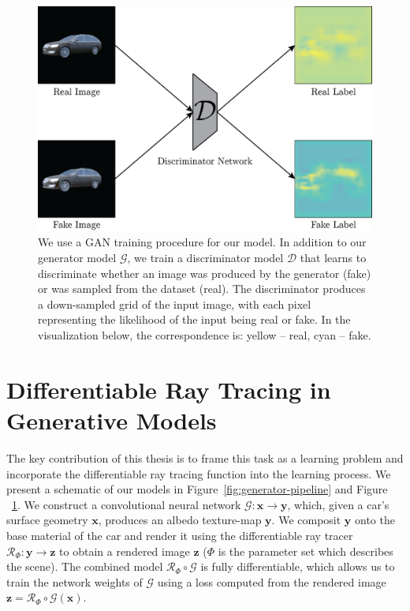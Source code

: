 \begin{figure}[ht]
    \centering
    \caption{We use a GAN training procedure for our model. In addition to our generator model $\mathcal{G}$, we
    train a discriminator model $\mathcal{D}$ that learns to discriminate whether an image was produced by the
    generator (fake) or was sampled from the dataset (real). The discriminator produces a down-sampled grid of
    the input image, with each pixel representing the likelihood of the input being real or fake. In the
    visualization below, the correspondence is: yellow -- real, cyan -- fake.}
    \label{fig:discriminator-pipeline}
    \vspace{0.2in}
    \includegraphics[width=.9\linewidth]{graphics/pipeline-2.png}
\end{figure}

\section{Differentiable Ray Tracing in Generative Models} \label{sec:diffrtgan}

The key contribution of this thesis is to frame this task as a learning problem and
incorporate the differentiable ray tracing function \cite{li2018differentiable} into the
learning process. We present a schematic of our models in Figure~\ref{fig:generator-pipeline}
and Figure ~\ref{fig:discriminator-pipeline}. We construct a convolutional neural network
$\mathcal{G}: \mathbf{x} \rightarrow \mathbf{y}$, which, given a car's surface geometry
$\mathbf{x}$, produces an albedo texture-map $\mathbf{y}$. We composit $\mathbf{y}$ onto the
base material of the car and render it using the differentiable ray tracer
$\mathcal{R}_\Phi: \mathbf{y} \rightarrow \mathbf{z}$ to obtain a rendered image $\mathbf{z}$
($\Phi$ is the parameter set which describes the scene). The combined model
$\mathcal{R}_\Phi \circ \mathcal{G}$ is fully differentiable, which allows us to train the
network weights of $\mathcal{G}$ using a loss computed from the rendered image
$\mathbf{z} = \mathcal{R}_\Phi \circ \mathcal{G}(\mathbf{x})$.

